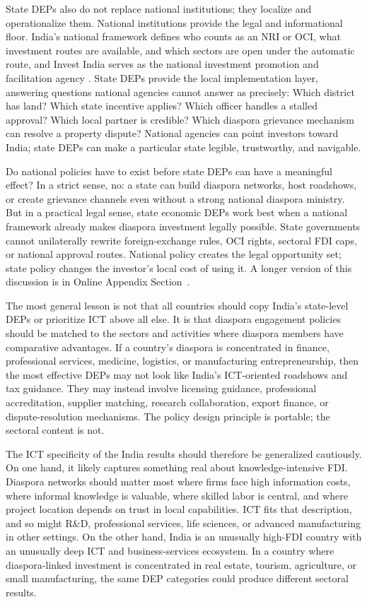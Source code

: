 \documentclass[12pt]{article}
\begin{document}
State DEPs also do not replace national institutions; they localize and operationalize them. National institutions provide the legal and informational floor. India's national framework defines who counts as an NRI or OCI, what investment routes are available, and which sectors are open under the automatic route, and Invest India serves as the national investment promotion and facilitation agency \citep{maximize_india_with_maximum_world_about_nodate}. State DEPs provide the local implementation layer, answering questions national agencies cannot answer as precisely: Which district has land? Which state incentive applies? Which officer handles a stalled approval? Which local partner is credible? Which diaspora grievance mechanism can resolve a property dispute? National agencies can point investors toward India; state DEPs can make a particular state legible, trustworthy, and navigable.

Do national policies have to exist before state DEPs can have a meaningful effect? In a strict sense, no: a state can build diaspora networks, host roadshows, or create grievance channels even without a strong national diaspora ministry. But in a practical legal sense, state economic DEPs work best when a national framework already makes diaspora investment legally possible. State governments cannot unilaterally rewrite foreign-exchange rules, OCI rights, sectoral FDI caps, or national approval routes. National policy creates the legal opportunity set; state policy changes the investor's local cost of using it. A longer version of this discussion is in Online Appendix Section~.

The most general lesson is not that all countries should copy India's state-level DEPs or prioritize ICT above all else. It is that diaspora engagement policies should be matched to the sectors and activities where diaspora members have comparative advantages. If a country's diaspora is concentrated in finance, professional services, medicine, logistics, or manufacturing entrepreneurship, then the most effective DEPs may not look like India's ICT-oriented roadshows and tax guidance. They may instead involve licensing guidance, professional accreditation, supplier matching, research collaboration, export finance, or dispute-resolution mechanisms. The policy design principle is portable; the sectoral content is not.

The ICT specificity of the India results should therefore be generalized cautiously. On one hand, it likely captures something real about knowledge-intensive FDI. Diaspora networks should matter most where firms face high information costs, where informal knowledge is valuable, where skilled labor is central, and where project location depends on trust in local capabilities. ICT fits that description, and so might R\&D, professional services, life sciences, or advanced manufacturing in other settings. On the other hand, India is an unusually high-FDI country with an unusually deep ICT and business-services ecosystem. In a country where diaspora-linked investment is concentrated in real estate, tourism, agriculture, or small manufacturing, the same DEP categories could produce different sectoral results.
\end{document}
